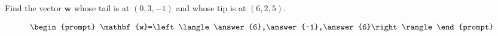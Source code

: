 \documentclass{ximera}
\author{Gregory Hartman \and Matthew Carr}
\begin{document}
\begin{exercise}




Find the vector $\mathbf{w}$ whose tail is at $(0,3,-1)$ and whose tip is at $(6,2,5)$.

\[
\begin{prompt}
\mathbf{w}=\left\langle\answer{6},\answer{-1},\answer{6}\right\rangle
\end{prompt}
\]

\end{exercise}
\end{document}
